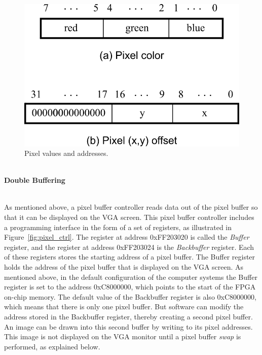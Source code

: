 \documentclass[epsfig,10pt,fullpage]{article}
\begin{document}
\begin{figure}[b]
   \begin{center}
       \includegraphics{figures/fig_pixels.png}
   \end{center}
   \caption{Pixel values and addresses.}
	\label{fig:pixels}
\end{figure}

~\\
\noindent
{\bf Double Buffering}
\label{sec:double_buffer}

~\\
\noindent
As mentioned above, a pixel buffer controller reads data out of the pixel buffer so that it 
can be displayed on the VGA screen. This pixel buffer controller 
includes a programming interface in the form of a set of registers, as
illustrated in Figure~\ref{fig:pixel_ctrl}. The register at address {\sf 0xFF203020} is called 
the {\it Buffer} register, and the register at address  {\sf 0xFF203024} is the 
{\it Backbuffer} register. Each of these registers stores the starting address of a pixel 
buffer.  The Buffer register holds the address of the pixel buffer that is displayed on
the VGA screen. As mentioned above, in the default configuration of the computer systems the 
Buffer register is set to the address {\sf 0xC8000000}, which points to the start of the FPGA 
on-chip memory.  The default value of the Backbuffer register is also {\sf 0xC8000000},
which means that there is only one pixel buffer. But software can modify the address
stored in the Backbuffer register, thereby creating a second pixel buffer. An image can be
drawn into this second buffer by writing to its pixel addresses. This image is not displayed 
on the VGA monitor until a pixel buffer {\it swap} is performed, as explained below.
\end{document}
